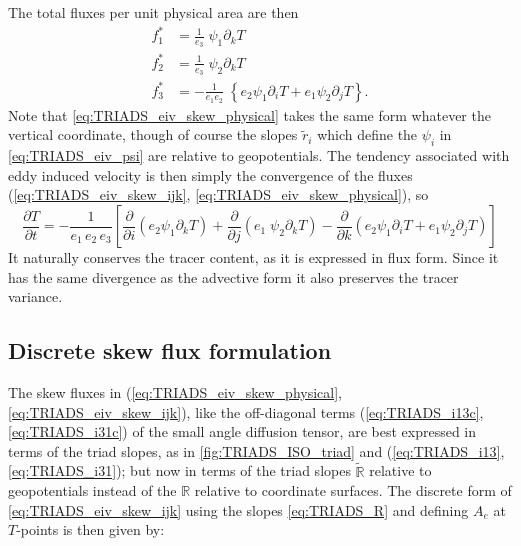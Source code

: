 \documentclass[../main/NEMO_manual]{subfiles}
\begin{document}
The total fluxes per unit physical area are then
\begin{equation}
  \label{eq:TRIADS_eiv_skew_physical}
  \begin{split}
    f^*_1 & = \frac{1}{e_{3}}\; \psi_1 \partial_k T   \\
    f^*_2 & = \frac{1}{e_{3}}\; \psi_2 \partial_k T   \\
    f^*_3 & =  -\frac{1}{e_{1}e_{2}}\; \left\{ e_{2} \psi_1 \partial_i T + e_{1} \psi_2 \partial_j T \right\}.
\end{split}
\end{equation}
Note that \autoref{eq:TRIADS_eiv_skew_physical} takes the same form whatever the vertical coordinate,
though of course the slopes $\tilde{r}_i$ which define the $\psi_i$ in \autoref{eq:TRIADS_eiv_psi} are relative to
geopotentials.
The tendency associated with eddy induced velocity is then simply the convergence of the fluxes
(\autoref{eq:TRIADS_eiv_skew_ijk}, \autoref{eq:TRIADS_eiv_skew_physical}), so
\[
  \frac{\partial T}{\partial t}= -\frac{1}{e_1 \, e_2 \, e_3 }      \left[
    \frac{\partial}{\partial i} \left( e_2 \psi_1 \partial_k T\right)
    + \frac{\partial}{\partial j} \left( e_1  \;
      \psi_2 \partial_k T\right)
    -  \frac{\partial}{\partial k} \left( e_{2} \psi_1 \partial_i T
      + e_{1} \psi_2 \partial_j T \right)  \right]
\]
It naturally conserves the tracer content, as it is expressed in flux form.
Since it has the same divergence as the advective form it also preserves the tracer variance.

\subsection{Discrete skew flux formulation}

The skew fluxes in (\autoref{eq:TRIADS_eiv_skew_physical}, \autoref{eq:TRIADS_eiv_skew_ijk}),
like the off-diagonal terms (\autoref{eq:TRIADS_i13c}, \autoref{eq:TRIADS_i31c}) of the small angle diffusion tensor,
are best expressed in terms of the triad slopes, as in \autoref{fig:TRIADS_ISO_triad} and
(\autoref{eq:TRIADS_i13}, \autoref{eq:TRIADS_i31});
but now in terms of the triad slopes $\tilde{\mathbb{R}}$ relative to geopotentials instead of
the $\mathbb{R}$ relative to coordinate surfaces.
The discrete form of \autoref{eq:TRIADS_eiv_skew_ijk} using the slopes \autoref{eq:TRIADS_R} and
defining $A_e$ at $T$-points is then given by:
\end{document}
